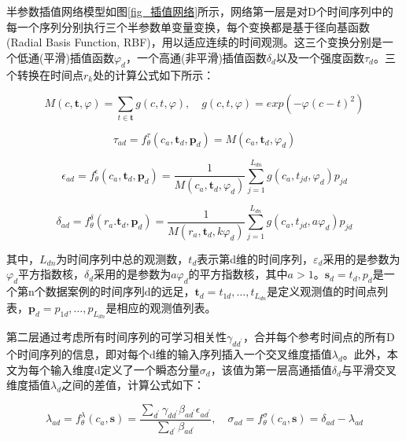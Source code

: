 \documentclass[a4paper,10pt]{my_paper}
\numberwithin{equation}{section}
\begin{document}
半参数插值网络模型如图\ref{fig_插值网络}所示，网络第一层是对D个时间序列中的每一个序列分别执行三个半参数单变量变换，每个变换都是基于径向基函数(Radial Basis Function, RBF)，用以适应连续的时间观测。这三个变换分别是一个低通(平滑)插值函数${\varphi_d}$，一个高通(非平滑)插值函数${\delta_d}$以及一个强度函数${\tau_d}$。三个转换在时间点${r_k}$处的计算公式如下所示：

\begin{equation}
  M(c,\textbf{t},\varphi)=\sum_{t\in \textbf{t}}g(c,t,\varphi), \quad g(c,t,\varphi )=exp(-\varphi (c-t)^2) 
\end{equation}

\begin{equation}
  \tau_{ad} = f_\theta^\tau (c_a, \textbf{t}_d, \textbf{p}_d) = M(c_a, \textbf{t}_d,\varphi_d)
\end{equation}

\begin{equation}
  \epsilon_{ad} = f_\theta^\epsilon (c_a, \textbf{t}_d, \textbf{p}_d) = \frac{1}{M(c_a,\textbf{t}_d, \varphi _d)}\sum_{j = 1}^{L_{dn}}g(c_a, t_{jd},\varphi _d)p_{jd}  
\end{equation}

\begin{equation}
  \delta_{ad} = f_\theta^\delta(r_a.\textbf{t}_d,\textbf{p}_d)=\frac{1}{M(r_a,\textbf{t}_d,k\varphi_d)}\sum_{j = 1}^{L_{dn}}g(c_a,t_{jd},a\varphi_d)p_{jd}  
\end{equation}

其中，${L_{dn}}$为时间序列中总的观测数，${t_d}$表示第d维的时间序列，${\varepsilon_d}$采用的是参数为${\varphi_d}$平方指数核，${\delta_d}$采用的是参数为${a\varphi_d}$的平方指数核，其中${a>1}$。${\textbf{s}_d={t_d,p_d}}$是一个第n个数据案例的时间序列d的远足，${\textbf{t}_d={t_{1d},\dots,t_{L_{dn}}}}$是定义观测值的时间点列表，${\textbf{p}_d={p_{1d},\dots,p_{L_{dn}}}}$是相应的观测值列表。

第二层通过考虑所有时间序列的可学习相关性${\gamma_{dd^{'}}}$，合并每个参考时间点的所有D个时间序列的信息，即对每个d维的输入序列插入一个交叉维度插值${\lambda_d}$。此外，本文为每个输入维度d定义了一个瞬态分量${\sigma_d}$，该值为第一层高通插值${\delta_d}$与平滑交叉维度插值${\lambda_d}$之间的差值，计算公式如下：

\begin{equation}
  \lambda_{ad} = f_{\theta}^\lambda(c_a, \textbf{s}) = \frac{\sum_{d^{'}}\gamma_{dd^{'}}\beta_{ad^{'}}\epsilon_{ad^{'}}}{\sum_{d^{'}}\beta_{ad^{'}}}, \quad \sigma_{ad} = f_{\theta}^\sigma(c_a,\textbf{s}) = \delta_{ad}-\lambda _{ad} 
\end{equation}
\end{document}
